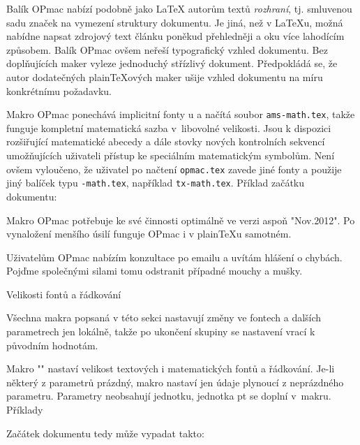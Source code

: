 Balík OPmac nabízí podobně jako \LaTeX{} autorům textů {\it rozhraní}, tj.
smluvenou sadu značek na vymezení struktury dokumentu. Je jiná, než v
\LaTeX{}u, možná nabídne napsat zdrojový text článku poněkud přehledněji a
oku více lahodícím způsobem. Balík OPmac ovšem neřeší typografický vzhled
dokumentu. Bez doplňujících maker vyleze jednoduchý střízlivý dokument.
Předpokládá se, že autor dodatečných plain\TeX{}ových maker ušije vzhled
dokumentu na míru konkrétnímu požadavku.

Makro OPmac ponechává implicitní fonty \csplain{}u a načítá 
soubor {\tt ams-math.tex}, takže funguje kompletní matematická sazba
v~libovolné velikosti. Jsou k dispozici rozšiřující matematické
abecedy a dále stovky nových kontrolních sekvencí umožňujících uživateli 
přístup ke speciálním matematickým symbolům. 
Není ovšem vyloučeno, že uživatel
po načtení {\tt opmac.tex} zavede jiné fonty a použije jiný balíček typu
{\tt *-math.tex}, například {\tt tx-math.tex}. Příklad začátku dokumentu:

\begtt
\chyph            %
\typosize[12/14]  %
\endtt

Makro OPmac potřebuje ke své činnosti \csplain{} optimálně ve verzi aspoň
"Nov.2012". Po vynaložení menšího úsilí funguje OPmac i v plain\TeX{}u
samotném.

Uživatelům OPmac nabízím konzultace po emailu a uvítám hlášení o chybách.
Pojďme společnými silami tomu odstranit případné mouchy a mušky.


\sec Velikosti fontů a řádkování

Všechna makra popsaná v této sekci nastavují změny ve fontech a dalších
parametrech jen lokálně, takže po ukončení skupiny se nastavení vrací k původním
hodnotám.

Makro "" nastaví velikost textových i
matematických fontů a řádkování. Je-li některý z parametrů prázdný, makro
nastaví jen údaje plynoucí z neprázdného parametru. 
Parametry neobsahují jednotku, jednotka pt se doplní v~makru. Příklady

\begtt
\typosize[10/12]    %
\typosize[11/12.5]  %
\typosize[8/]       %
\endtt

Začátek dokumentu tedy může vypadat takto:

